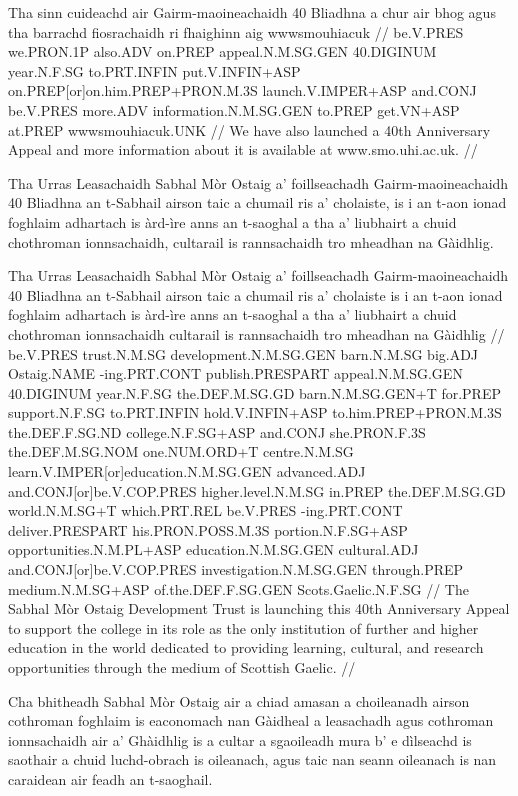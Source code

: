 \documentclass[a4paper,10pt]{article}
\begin{document}
\vspace{4mm}
\gla Tha sinn cuideachd air Gairm-maoineachaidh 40 Bliadhna a chur air bhog agus tha barrachd fiosrachaidh ri fhaighinn aig wwwsmouhiacuk  //
\glb be.V.PRES we.PRON.1P also.ADV on.PREP appeal.N.M.SG.GEN 40.DIGINUM year.N.F.SG to.PRT.INFIN put.V.INFIN+ASP on.PREP[or]on.him.PREP+PRON.M.3S launch.V.IMPER+ASP and.CONJ be.V.PRES more.ADV information.N.M.SG.GEN to.PREP get.VN+ASP at.PREP wwwsmouhiacuk.UNK  //
\glft We have also launched a 40th Anniversary Appeal and more information about it is available at www.smo.uhi.ac.uk. //
\endgl
\xe

\ex
\begingl
\glpre Tha Urras Leasachaidh Sabhal Mòr Ostaig a' foillseachadh Gairm-maoineachaidh 40 Bliadhna an t-Sabhail airson taic a chumail ris a' cholaiste, is i an t-aon ionad foghlaim adhartach is àrd-ìre anns an t-saoghal a tha a' liubhairt a chuid chothroman ionnsachaidh, cultarail is rannsachaidh tro mheadhan na Gàidhlig. 

\vspace{4mm}
\gla Tha Urras Leasachaidh Sabhal Mòr Ostaig a' foillseachadh Gairm-maoineachaidh 40 Bliadhna an t-Sabhail airson taic a chumail ris a' cholaiste is i an t-aon ionad foghlaim adhartach is àrd-ìre anns an t-saoghal a tha a' liubhairt a chuid chothroman ionnsachaidh cultarail is rannsachaidh tro mheadhan na Gàidhlig  //
\glb be.V.PRES trust.N.M.SG development.N.M.SG.GEN barn.N.M.SG big.ADJ Ostaig.NAME -ing.PRT.CONT publish.PRESPART appeal.N.M.SG.GEN 40.DIGINUM year.N.F.SG the.DEF.M.SG.GD barn.N.M.SG.GEN+T for.PREP support.N.F.SG to.PRT.INFIN hold.V.INFIN+ASP to.him.PREP+PRON.M.3S the.DEF.F.SG.ND college.N.F.SG+ASP and.CONJ she.PRON.F.3S the.DEF.M.SG.NOM one.NUM.ORD+T centre.N.M.SG learn.V.IMPER[or]education.N.M.SG.GEN advanced.ADJ and.CONJ[or]be.V.COP.PRES higher.level.N.M.SG in.PREP the.DEF.M.SG.GD world.N.M.SG+T which.PRT.REL be.V.PRES -ing.PRT.CONT deliver.PRESPART his.PRON.POSS.M.3S portion.N.F.SG+ASP opportunities.N.M.PL+ASP education.N.M.SG.GEN cultural.ADJ and.CONJ[or]be.V.COP.PRES investigation.N.M.SG.GEN through.PREP medium.N.M.SG+ASP of.the.DEF.F.SG.GEN Scots.Gaelic.N.F.SG  //
\glft The Sabhal Mòr Ostaig Development Trust is launching this 40th Anniversary Appeal to support the college in its role as the only institution of further and higher education in the world dedicated to providing learning, cultural, and research opportunities through the medium of Scottish Gaelic. //
\endgl
\xe

\ex
\begingl
\glpre Cha bhitheadh Sabhal Mòr Ostaig air a chiad amasan a choileanadh airson cothroman foghlaim is eaconomach nan Gàidheal a leasachadh agus cothroman ionnsachaidh air a' Ghàidhlig is a cultar a sgaoileadh mura b' e dìlseachd is saothair a chuid luchd-obrach is oileanach, agus taic nan seann oileanach is nan caraidean air feadh an t-saoghail. 
\end{document}
